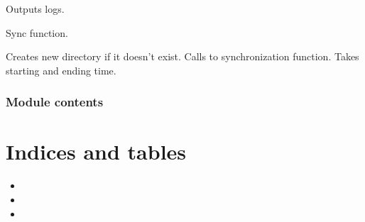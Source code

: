 \documentclass[letterpaper,10pt,english]{sphinxmanual}
\begin{document}
\begin{fulllineitems}
\begin{fulllineitems}
\label{\detokenize{sync:sync.syncer.Syncer.print_logs}}
\pysigstartsignatures
{}
\pysigstopsignatures
\sphinxAtStartPar
Outputs logs.

\end{fulllineitems}


\begin{fulllineitems}
\label{\detokenize{sync:sync.syncer.Syncer.sync}}
\pysigstartsignatures
{}
\pysigstopsignatures
\sphinxAtStartPar
Sync function.

\end{fulllineitems}


\begin{fulllineitems}
\label{\detokenize{sync:sync.syncer.Syncer.sync_work}}
\pysigstartsignatures
{}
\pysigstopsignatures
\sphinxAtStartPar
Creates new directory if it doesn’t exist. Calls to synchronization function. Takes starting and ending
time.

\end{fulllineitems}


\end{fulllineitems}



\subsection{Module contents}
\label{\detokenize{sync:module-sync}}\label{\detokenize{sync:module-contents}}

\chapter{Indices and tables}
\label{\detokenize{index:indices-and-tables}}\begin{itemize}
\item {} 
\sphinxAtStartPar
{}

\item {} 
\sphinxAtStartPar
{}

\item {} 
\sphinxAtStartPar
{}

\end{itemize}
\end{document}
